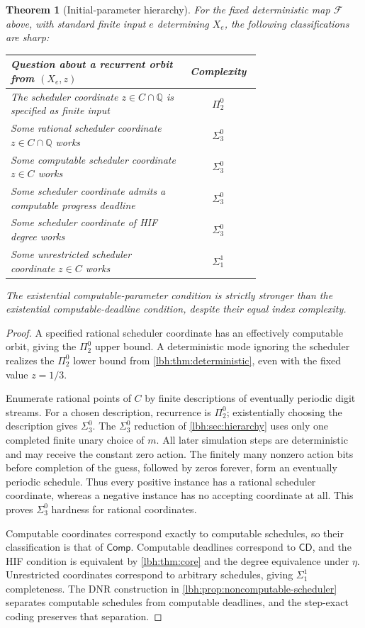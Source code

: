 \documentclass[11pt,letterpaper]{article}
\newtheorem{theorem}{Theorem}[section]
\theoremstyle{definition}
\theoremstyle{remark}
\newcommand{\Q}{\mathbb Q}
\newcommand{\sig}[1]{\Sigma^{0}_{#1}}
\newcommand{\ppi}[1]{\Pi^{0}_{#1}}
\newcommand{\an}{\Sigma^{1}_{1}}
\newcommand{\Clock}{\mathsf{CD}}
\newcommand{\Comp}{\mathsf{Comp}}
\newcommand{\1}{\mathbf 1}
\begin{document}
\begin{theorem}[Initial-parameter hierarchy]\label{lbh:thm:initial}
For the fixed deterministic map $\mathcal F$ above, with standard finite
input $e$ determining $X_e$, the following classifications are sharp:
\begin{center}
\begin{tabular}{@{}p{0.70\linewidth}c@{}}
\toprule
Question about a recurrent orbit from $(X_e,z)$ & Complexity\\
\midrule
The scheduler coordinate $z\in C\cap\Q$ is specified as finite input & $\ppi2$\\
Some rational scheduler coordinate $z\in C\cap\Q$ works & $\sig3$\\
Some computable scheduler coordinate $z\in C$ works & $\sig3$\\
Some scheduler coordinate admits a computable progress deadline & $\sig3$\\
Some scheduler coordinate of HIF degree works & $\sig3$\\
Some unrestricted scheduler coordinate $z\in C$ works & $\an$\\
\bottomrule
\end{tabular}
\end{center}
The existential computable-parameter condition is strictly stronger than
the existential computable-deadline condition, despite their equal index
complexity.
\end{theorem}
\begin{proof}
A specified rational scheduler coordinate has an effectively computable
orbit, giving the $\ppi2$ upper bound. A deterministic mode ignoring the
scheduler realizes the $\ppi2$ lower bound from
\cref{lbh:thm:deterministic}, even with the fixed value $z=1/3$.

Enumerate rational points of $C$ by finite descriptions of eventually
periodic digit streams. For a chosen description, recurrence is $\ppi2$;
existentially choosing the description gives $\sig3$. The $\sig3$ reduction
of \cref{lbh:sec:hierarchy} uses only one completed finite unary choice of $m$.
All later simulation steps are deterministic and may receive the constant
zero action. The finitely many nonzero action bits before completion of
the guess, followed by zeros forever, form an eventually periodic schedule.
Thus every positive instance has a rational scheduler coordinate, whereas
a negative instance has no accepting coordinate at all. This proves
$\sig3$ hardness for rational coordinates.

Computable coordinates correspond exactly to computable schedules, so their
classification is that of $\Comp$. Computable deadlines correspond to
$\Clock$, and the HIF condition is equivalent by \cref{lbh:thm:core} and the
degree equivalence under $\eta$. Unrestricted coordinates correspond to
arbitrary schedules, giving $\an$ completeness. The DNR construction
in \cref{lbh:prop:noncomputable-scheduler} separates computable schedules from
computable deadlines, and the step-exact coding preserves that separation.
\end{proof}
\end{document}
